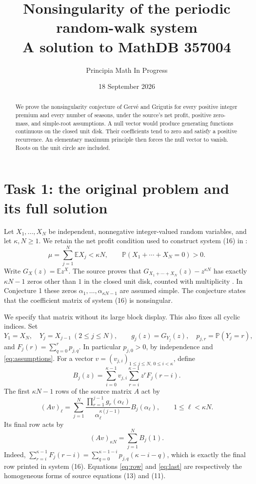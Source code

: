 \documentclass[11pt]{article}
\title{Nonsingularity of the periodic random-walk system\\
\large A solution to MathDB 357004}
\author{Principia Math In Progress}
\date{18 September 2026}
\begin{document}
\maketitle
\begin{abstract}
We prove the nonsingularity conjecture of Gerv\'e and Grigutis for
every positive integer premium and every number of seasons, under
the source's net profit, positive zero-mass, and simple-root assumptions.
A null vector would produce generating functions continuous on the
closed unit disk. Their coefficients tend to zero and satisfy a
positive recurrence. An elementary maximum principle then forces
the null vector to vanish. Roots on the unit circle are included.
\end{abstract}

\section*{Task 1: the original problem and its full solution}
Let $X_1,\ldots,X_N$ be independent, nonnegative integer-valued
random variables, and let $\kappa,N\geq1$. We retain the net profit
condition used to construct system (16) in \cite{GG}:
\begin{equation}\label{eq:assumptions}
 \mu=\sum_{j=1}^N\mathbb E X_j<\kappa N,\qquad
 \mathbb P(X_1+\cdots+X_N=0)>0.
\end{equation}
Write $G_X(z)=\mathbb E z^X$. The source proves that
$G_{X_1+\cdots+X_N}(z)-z^{\kappa N}$ has exactly $\kappa N-1$
zeros other than $1$ in the closed unit disk, counted with
multiplicity \cite[Lemma 4]{GG}. In Conjecture 1 these zeros
$\alpha_1,\ldots,\alpha_{\kappa N-1}$ are assumed simple.
The conjecture states that the coefficient matrix of system (16)
is nonsingular.

We specify that matrix without its large block display. This also
fixes all cyclic indices. Set
\[
 Y_1=X_N,\quad Y_j=X_{j-1}\ (2\leq j\leq N),\qquad
 g_j(z)=G_{Y_j}(z),\quad p_{j,r}=\mathbb P(Y_j=r),
\]
and $F_j(r)=\sum_{q=0}^r p_{j,q}$. In particular $p_{j,0}>0$,
by independence and \eqref{eq:assumptions}. For a vector
$v=(v_{j,i})_{1\leq j\leq N,\ 0\leq i<\kappa}$, define
\begin{equation}\label{eq:B}
 B_j(z)=\sum_{i=0}^{\kappa-1}v_{j,i}
                 \sum_{r=i}^{\kappa-1}z^r F_j(r-i).
\end{equation}
The first $\kappa N-1$ rows of the source matrix $A$ act by
\begin{equation}\label{eq:row}
 (Av)_\ell=\sum_{j=1}^N
 \frac{\prod_{r=1}^{j-1}g_r(\alpha_\ell)}
      {\alpha_\ell^{\kappa(j-1)}}B_j(\alpha_\ell),
 \qquad 1\leq\ell<\kappa N.
\end{equation}
Its final row acts by
\begin{equation}\label{eq:last}
 (Av)_{\kappa N}=\sum_{j=1}^N B_j(1).
\end{equation}
Indeed,
$\sum_{r=i}^{\kappa-1}F_j(r-i)
=\sum_{q=0}^{\kappa-1-i}p_{j,q}(\kappa-i-q)$,
which is exactly the final row printed in system (16).
Equations \eqref{eq:row} and \eqref{eq:last} are respectively the
homogeneous forms of source equations (13) and (11).
\end{document}
